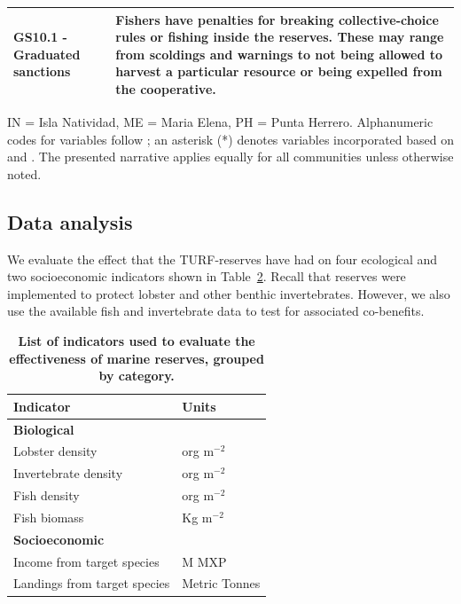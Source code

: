 \documentclass[10pt,letterpaper]{article}
\begin{document}
\begin{table}[!ht]
{\begin{tabular}{>{\raggedright\arraybackslash}p{6.5cm}|>{\raggedright\arraybackslash}p{12.2cm}}
\hline
GS10.1 - Graduated sanctions & Fishers have penalties for breaking collective-choice rules or fishing inside the reserves. These may range from scoldings and warnings to not being allowed to harvest a particular resource or being expelled from the cooperative.\\
\hline
\end{tabular}}
\label{table:ses}
IN = Isla Natividad, ME = Maria Elena, PH = Punta Herrero. Alphanumeric codes for variables follow \cite{basurto_2013-oq}; an asterisk (*) denotes variables incorporated based on \cite{difranco_2016-Xw} and \cite{edgar_2014-UO}. The presented narrative applies equally for all communities unless otherwise noted.
\end{table}

\subsection*{Data analysis}

We evaluate the effect that the TURF-reserves have had on four ecological and two socioeconomic indicators shown in Table~\ref{table:indicators}. Recall that reserves were implemented to protect lobster and other benthic invertebrates. However, we also use the available fish and invertebrate data to test for associated co-benefits.

\begin{table}[!ht]

\caption{
{\bf List of indicators used to evaluate the effectiveness of marine reserves, grouped by category.}}
\centering
\begin{tabular}{l|l}
\hline
Indicator & Units\\
\hline
\multicolumn{2}{l}{\textbf{Biological}}\\
\hline
\hspace{1em}Lobster density & org $\mathrm{m}^{-2}$\\
\hline
\hspace{1em}Invertebrate density & org $\mathrm{m}^{-2}$\\
\hline
\hspace{1em}Fish density & org $\mathrm{m}^{-2}$\\
\hline
\hspace{1em}Fish biomass & Kg $\mathrm{m}^{-2}$\\
\hline
\multicolumn{2}{l}{\textbf{Socioeconomic}}\\
\hline
\hspace{1em}Income from target species & M MXP\\
\hline
\hspace{1em}Landings from target species & Metric Tonnes\\
\hline
\end{tabular}
\label{table:indicators}
\end{table}
\end{document}
